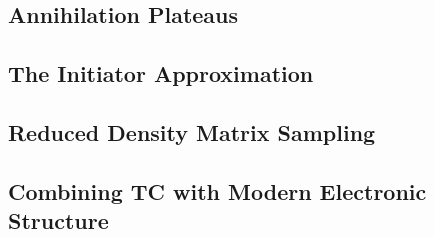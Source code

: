\subsection{Annihilation Plateaus}


\subsection{The Initiator Approximation}

\subsection{Reduced Density Matrix Sampling}

\subsection{Combining TC with Modern Electronic Structure}
